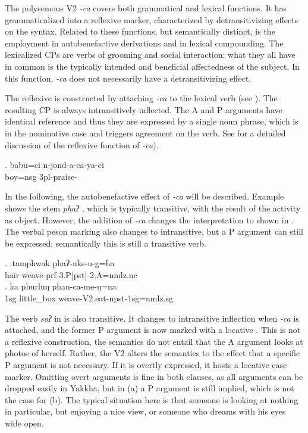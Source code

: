  The polysemous V2 \emph{-ca}  covers both grammatical and lexical functions. It has grammaticalized into a reflexive marker, characterized by detransitivizing effects on the syntax. Related to these functions, but semantically distinct, is the employment in autobenefactive derivations and in lexical compounding. The lexicalized CPs are verbs of  grooming and social interaction: what  they all have in common is the typically intended and beneficial affectedness of the subject. In this function, \emph{-ca} does not necessarily have a detransitivizing effect.
 
 The reflexive is constructed by attaching  \emph{-ca}  to the lexical verb (see \Next). The resulting CP is always intransitively inflected. The A and P arguments have identical reference and thus they are expressed by a single noun phrase, which is in the nominative case and triggers agreement on the verb. See  for a detailed discussion of the reflexive function of \emph{-ca}). 
 
 \exg. babu=ci n-jond-a-ca-ya-ci\\
boy{\sc =nsg} {\sc 3pl}-praise-\\

In the following, the autobenefactive effect of \emph{-ca} will be described. Example \Next[a] shows the stem \emph{phaʔ} , which is typically transitive, with  the result of the activity as object. However, the addition of  \emph{-ca} changes the interpretation to  shown in \Next[b]. The verbal peson marking also changes to intransitive, but a P argument can still be expressed; semantically this is still a transitive verb.  

\ex. \ag.tamphwak phaʔ-uks-u-g=ha\\
		hair weave{\sc -prf-3.P[pst]-2.A=nmlz.nc} \\
\bg. ka phurluŋ phan-ca-me-ŋ=na\\
		{\sc 1sg} little\_box weave{\sc -V2.eat-npst-1sg=nmlz.sg} \\


The verb \emph{soʔ}  in \Next is also transitive. It changes to intransitive inflection when  \emph{-ca} is attached, and the former P argument is now marked with a locative \Next[b]. This is not a reflexive construction, the semantics do not entail that the A argument looks at photos of herself. Rather, the V2 alters the semantics to the effect that a specific P argument is not necessary. If it is overtly expressed, it hosts a locative case marker. Omitting overt arguments is fine in both clauses, as all arguments can be dropped easily in Yakkha, but in (a) a P argument is still implied, which is not the case for (b). The typical situation here is that someone is looking at nothing in particular, but enjoying a nice view, or someone who dreams with his eyes wide open.

